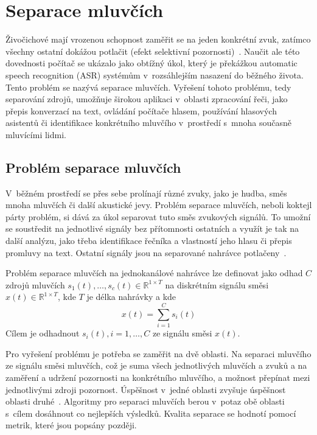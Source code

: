 \chapter{Separace mluvčích}
\label{separace}
Živočichové mají vrozenou schopnost zaměřit se na jeden konkrétní zvuk, zatímco všechny ostatní dokážou potlačit (efekt selektivní pozornosti)~\cite{GETZMANN20171}. Naučit ale této dovednosti počítač se ukázalo jako obtížný úkol, který je překážkou automatic speech recognition (ASR) systémům v~rozsáhlejším nasazení do běžného života. Tento problém se nazývá separace mluvčích. Vyřešení tohoto problému, tedy separování zdrojů, umožňuje širokou aplikaci v~oblasti zpracování řeči, jako přepis konverzací na text, ovládání počítače hlasem, používání hlasových asistentů či identifikace konkrétního mluvčího v~prostředí s~mnoha současně mluvícími lidmi.


\section{Problém separace mluvčích}
V~běžném prostředí se přes sebe prolínají různé zvuky, jako je hudba, směs mnoha mluvčích či další akustické jevy. Problém separace mluvčích, neboli koktejl párty problém, si dává za úkol separovat tuto směs zvukových signálů. To umožní se soustředit na jednotlivé signály bez přítomnosti ostatních a využít je tak na další analýzu, jako třeba identifikace řečníka a vlastností jeho hlasu či přepis promluvy na text. Ostatní signály jsou na separované nahrávce potlačeny~\cite{cocktailparty}.

Problém separace mluvčích na jednokanálové nahrávce lze definovat jako odhad $C$ zdrojů mluvčích $s_1(t), \dots, s_c(t) \in \mathbb{R}^{1 \times T}$ na diskrétním signálu směsi $x(t)\in \mathbb{R}^{1 \times T}$, kde $T$ je délka nahrávky a kde
\begin{equation}
  x(t) = \sum_{i=1}^C s_i(t)
  \label{equ:definiceseparace}
\end{equation}
Cílem je odhadnout $s_i(t), i = 1, \dots, C$ ze signálu směsi $x(t)$.

Pro vyřešení problému je potřeba se zaměřit na dvě oblasti. Na separaci mluvčího ze signálu směsi mluvčích, což je suma všech jednotlivých mluvčích a zvuků a na zaměření a udržení pozornosti na konkrétního mluvčího, a možnost přepínat mezi jednotlivými zdroji pozornost. Úspěšnost v~jedné oblasti zvyšuje úspěšnost oblasti druhé~\cite{cocktailparty}. Algoritmy pro separaci mluvčích berou v~potaz obě oblasti s~cílem dosáhnout co nejlepších výsledků. Kvalita separace se hodnotí pomocí metrik, které jsou popsány později. 


